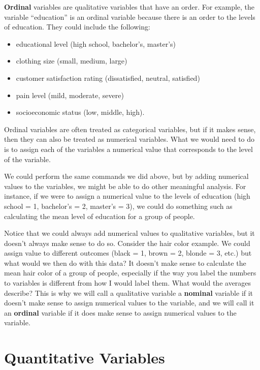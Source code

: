 \documentclass[
  letterpaper,
  DIV=11,
  numbers=noendperiod]{scrreprt}
\providecommand{\tightlist}{%
  \setlength{\itemsep}{0pt}\setlength{\parskip}{0pt}}\usepackage{longtable,booktabs,array}
\begin{document}
\textbf{Ordinal} variables are qualitative variables that have an order.
For example, the variable ``education'' is an ordinal variable because
there is an order to the levels of education. They could include the
following:

\begin{itemize}
\tightlist
\item
  educational level (high school, bachelor's, master's)
\item
  clothing size (small, medium, large)
\item
  customer satisfaction rating (dissatisfied, neutral, satisfied)
\item
  pain level (mild, moderate, severe)
\item
  socioeconomic status (low, middle, high).
\end{itemize}

Ordinal variables are often treated as categorical variables, but if it
makes sense, then they can also be treated as numerical variables. What
we would need to do is to assign each of the variables a numerical value
that corresponds to the level of the variable.

We could perform the same commands we did above, but by adding numerical
values to the variables, we might be able to do other meaningful
analysis. For instance, if we were to assign a numerical value to the
levels of education (high school = 1, bachelor's = 2, master's = 3), we
could do something such as calculating the mean level of education for a
group of people.

Notice that we could always add numerical values to qualitative
variables, but it doesn't always make sense to do so. Consider the hair
color example. We could assign value to different outcomes (black = 1,
brown = 2, blonde = 3, etc.) but what would we then do with this data?
It doesn't make sense to calculate the mean hair color of a group of
people, especially if the way you label the numbers to variables is
different from how I would label them. What would the averages describe?
This is why we will call a qualitative variable a \textbf{nominal}
variable if it doesn't make sense to assign numerical values to the
variable, and we will call it an \textbf{ordinal} variable if it does
make sense to assign numerical values to the variable.

\section*{Quantitative Variables}\label{quantitative-variables}
\end{document}
